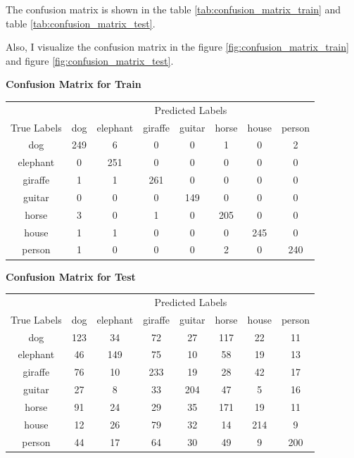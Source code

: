 \documentclass{article}
\begin{document}
The confusion matrix is shown in the table \ref{tab:confusion_matrix_train} and table \ref{tab:confusion_matrix_test}.

Also, I visualize the confusion matrix in the figure \ref{fig:confusion_matrix_train} and figure \ref{fig:confusion_matrix_test}.

\begin{center}
    \textbf{Confusion Matrix for Train}
    
    \begin{tabular}{c|ccccccc}
    \toprule
    & \multicolumn{7}{c}{Predicted Labels} \\
    \cmidrule(lr){2-8}
    True Labels & dog & elephant & giraffe & guitar & horse & house & person \\
    \midrule
    dog & 249 & 6 & 0 & 0 & 1 & 0 & 2 \\
    elephant & 0 & 251 & 0 & 0 & 0 & 0 & 0 \\
    giraffe & 1 & 1 & 261 & 0 & 0 & 0 & 0 \\
    guitar & 0 & 0 & 0 & 149 & 0 & 0 & 0 \\
    horse & 3 & 0 & 1 & 0 & 205 & 0 & 0 \\
    house & 1 & 1 & 0 & 0 & 0 & 245 & 0 \\
    person & 1 & 0 & 0 & 0 & 2 & 0 & 240 \\
    \bottomrule
    \end{tabular}
    \label{tab:confusion_matrix_train}
\end{center}

\begin{center}
    \textbf{Confusion Matrix for Test}
    
    \begin{tabular}{c|ccccccc}
    \toprule
    & \multicolumn{7}{c}{Predicted Labels} \\
    \cmidrule(lr){2-8}
    True Labels & dog & elephant & giraffe & guitar & horse & house & person \\
    \midrule
    dog & 123 & 34 & 72 & 27 & 117 & 22 & 11 \\
    elephant & 46 & 149 & 75 & 10 & 58 & 19 & 13 \\
    giraffe & 76 & 10 & 233 & 19 & 28 & 42 & 17 \\
    guitar & 27 & 8 & 33 & 204 & 47 & 5 & 16 \\
    horse & 91 & 24 & 29 & 35 & 171 & 19 & 11 \\
    house & 12 & 26 & 79 & 32 & 14 & 214 & 9 \\
    person & 44 & 17 & 64 & 30 & 49 & 9 & 200 \\
    \bottomrule
    \end{tabular}
    \label{tab:confusion_matrix_test}
\end{center}
\end{document}
